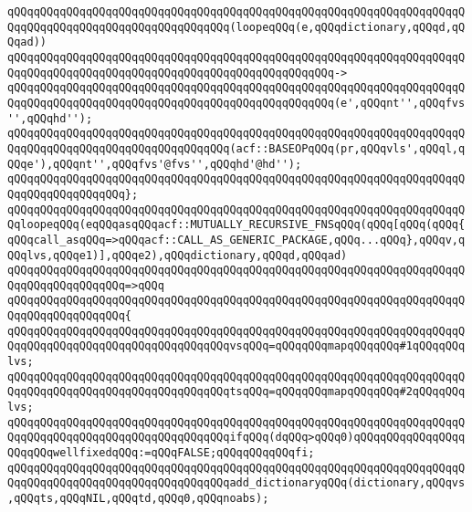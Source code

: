 \newline
\verb|qQQqqQQqqQQqqQQqqQQqqQQqqQQqqQQqqQQqqQQqqQQqqQQqqQQqqQQqqQQqqQQqqQQqqQQqqQQqqQQqqQQqqQQqqQQqqQQqqQQqqQQq(loopeqQQq(e,qQQqdictionary,qQQqd,qQQqad))|\newline
\verb|qQQqqQQqqQQqqQQqqQQqqQQqqQQqqQQqqQQqqQQqqQQqqQQqqQQqqQQqqQQqqQQqqQQqqQQqqQQqqQQqqQQqqQQqqQQqqQQqqQQqqQQqqQQqqQQqqQQqqQQq->|\newline
\verb|qQQqqQQqqQQqqQQqqQQqqQQqqQQqqQQqqQQqqQQqqQQqqQQqqQQqqQQqqQQqqQQqqQQqqQQqqQQqqQQqqQQqqQQqqQQqqQQqqQQqqQQqqQQqqQQqqQQqqQQq(e',qQQqnt'',qQQqfvs'',qQQqhd'');|\newline
\newline
\verb|qQQqqQQqqQQqqQQqqQQqqQQqqQQqqQQqqQQqqQQqqQQqqQQqqQQqqQQqqQQqqQQqqQQqqQQqqQQqqQQqqQQqqQQqqQQqqQQqqQQqqQQq(acf::BASEOPqQQq(pr,qQQqvls',qQQql,qQQqe'),qQQqnt'',qQQqfvs'@fvs'',qQQqhd'@hd'');|\newline
\verb|qQQqqQQqqQQqqQQqqQQqqQQqqQQqqQQqqQQqqQQqqQQqqQQqqQQqqQQqqQQqqQQqqQQqqQQqqQQqqQQqqQQqqQQq};|\newline
\newline
\verb|qQQqqQQqqQQqqQQqqQQqqQQqqQQqqQQqqQQqqQQqqQQqqQQqqQQqqQQqqQQqqQQqqQQqqQQqloopeqQQq(eqQQqasqQQqacf::MUTUALLY_RECURSIVE_FNSqQQq(qQQq[qQQq(qQQq{qQQqcall_asqQQq=>qQQqacf::CALL_AS_GENERIC_PACKAGE,qQQq...qQQq},qQQqv,qQQqlvs,qQQqe1)],qQQqe2),qQQqdictionary,qQQqd,qQQqad)|\newline
\verb|qQQqqQQqqQQqqQQqqQQqqQQqqQQqqQQqqQQqqQQqqQQqqQQqqQQqqQQqqQQqqQQqqQQqqQQqqQQqqQQqqQQqqQQq=>qQQq|\newline
\verb|qQQqqQQqqQQqqQQqqQQqqQQqqQQqqQQqqQQqqQQqqQQqqQQqqQQqqQQqqQQqqQQqqQQqqQQqqQQqqQQqqQQqqQQq{|\newline
\verb|qQQqqQQqqQQqqQQqqQQqqQQqqQQqqQQqqQQqqQQqqQQqqQQqqQQqqQQqqQQqqQQqqQQqqQQqqQQqqQQqqQQqqQQqqQQqqQQqqQQqqQQqvsqQQq=qQQqqQQqmapqQQqqQQq#1qQQqqQQqlvs;|\newline
\verb|qQQqqQQqqQQqqQQqqQQqqQQqqQQqqQQqqQQqqQQqqQQqqQQqqQQqqQQqqQQqqQQqqQQqqQQqqQQqqQQqqQQqqQQqqQQqqQQqqQQqqQQqtsqQQq=qQQqqQQqmapqQQqqQQq#2qQQqqQQqlvs;|\newline
\newline
\verb|qQQqqQQqqQQqqQQqqQQqqQQqqQQqqQQqqQQqqQQqqQQqqQQqqQQqqQQqqQQqqQQqqQQqqQQqqQQqqQQqqQQqqQQqqQQqqQQqqQQqqQQqifqQQq(dqQQq>qQQq0)qQQqqQQqqQQqqQQqqQQqqQQqwellfixedqQQq:=qQQqFALSE;qQQqqQQqqQQqfi;|\newline
\newline
\verb|qQQqqQQqqQQqqQQqqQQqqQQqqQQqqQQqqQQqqQQqqQQqqQQqqQQqqQQqqQQqqQQqqQQqqQQqqQQqqQQqqQQqqQQqqQQqqQQqqQQqqQQqadd_dictionaryqQQq(dictionary,qQQqvs,qQQqts,qQQqNIL,qQQqtd,qQQq0,qQQqnoabs);|\newline
